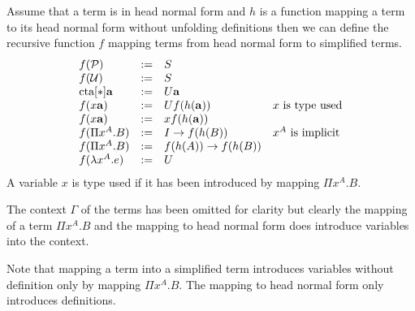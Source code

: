 Assume that a term is in head normal form and $h$ is a function mapping a term
to its head normal form without unfolding definitions then we can define the
recursive function $f$ mapping terms from head normal form to simplified terms.
$$
\begin{array}{lllll} 
    f({\cal P}) &:=& S
    \\
    f({\cal U})  &:=& S
    \\
    {\text{cta}}[*] {\mathbf a} &:=& U {\mathbf a}
    \\
    f(x {\mathbf a})  &:=& U f(h({\mathbf a}))
    &\text{$x$ is type used}
    \\
    f(x {\mathbf a})  &:=& x f(h({\mathbf a}))
    \\
    f(\Pi x^A.B) &:=& I \to f(h(B)) & \text{$x^A$ is implicit}
    \\
    f(\Pi x^A.B)
    &:=&
    f(h(A)) \to f(h(B))
    \\
    f(\lambda x^A.e) &:=& U
 \end{array}
$$
A variable $x$ is type used if it has been introduced by mapping $\Pi x^A.B$.

The context $\Gamma$ of the terms has been omitted for clarity but clearly the
mapping of a term $\Pi x^A.B$ and the mapping to head normal form does introduce
variables into the context.

Note that mapping a term into a simplified term introduces variables without
definition only by mapping $\Pi x^A.B$. The mapping to head normal form only
introduces definitions.

